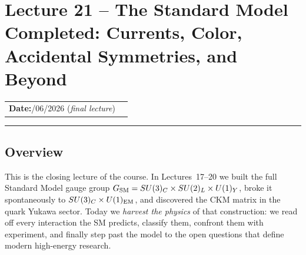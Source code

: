 
\section{Lecture 21 -- The Standard Model Completed: Currents, Color, Accidental Symmetries, and Beyond}\label{sec:lec21}
\begin{center}
\begin{tabular}{ll}
  \textbf{Date:}\quad 25/06/2026 \quad(\emph{final lecture}) & \\
\end{tabular}
\end{center}
\hrule\vspace{1.5em}

\subsection{Overview}\label{subsec:lec21:overview}

This is the closing lecture of the course. In
Lectures~17--20 we built the full Standard Model gauge group
$G_{\mathrm{SM}}=SU(3)_C\times SU(2)_L\times U(1)_Y$, broke it spontaneously to
$SU(3)_C\times U(1)_{\rm EM}$, and discovered the CKM matrix in the
quark Yukawa sector. Today we \emph{harvest the physics} of that
construction: we read off every interaction the SM predicts, classify
them, confront them with experiment, and finally step past the model to
the open questions that define modern high-energy research.


